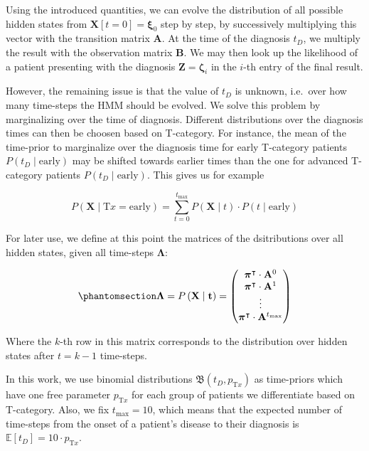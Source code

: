 \documentclass[
  sn-mathphys-num,
]{sn-jnl}
\begin{document}
Using the introduced quantities, we can evolve the distribution of all
possible hidden states from \(\mathbf{X}[t=0] = \boldsymbol{\xi}_0\)
step by step, by successively multiplying this vector with the
transition matrix \(\mathbf{A}\). At the time of the diagnosis \(t_D\),
we multiply the result with the observation matrix \(\mathbf{B}\). We
may then look up the likelihood of a patient presenting with the
diagnosis \(\mathbf{Z}=\boldsymbol{\zeta}_i\) in the \(i\)-th entry of
the final result.

However, the remaining issue is that the value of \(t_D\) is unknown,
i.e.~over how many time-steps the HMM should be evolved. We solve this
problem by marginalizing over the time of diagnosis. Different
distributions over the diagnosis times can then be choosen based on
T-category. For instance, the mean of the time-prior to marginalize over
the diagnosis time for early T-category patients
\(P\left( t_D \mid \text{early} \right)\) may be shifted towards earlier
times than the one for advanced T-category patients
\(P\left( t_D \mid \text{early} \right)\). This gives us for example

\[
P\left( \mathbf{X} \mid \text{T}x = \text{early} \right) = \sum_{t=0}^{t_\text{max}} P \left( \mathbf{X} \mid t \right) \cdot P(t \mid \text{early})
\]

For later use, we define at this point the matrices of the dsitributions
over all hidden states, given all time-steps \(\boldsymbol{\Lambda}\):

\begin{equation}\phantomsection\label{eq-lambda-matrix}{
\boldsymbol{\Lambda} = P \left( \mathbf{X} \mid \mathbf{t} \right) = \begin{pmatrix}
\boldsymbol{\pi}^\intercal \cdot \mathbf{A}^0 \\
\boldsymbol{\pi}^\intercal \cdot \mathbf{A}^1 \\
\vdots \\
\boldsymbol{\pi}^\intercal \cdot \mathbf{A}^{t_\text{max}} \\
\end{pmatrix}
}\end{equation}

Where the \(k\)-th row in this matrix corresponds to the distribution
over hidden states after \(t=k-1\) time-steps.

In this work, we use binomial distributions
\(\mathfrak{B} \left( t_D, p_{\text{T}x} \right)\) as time-priors which
have one free parameter \(p_{\text{T}x}\) for each group of patients we
differentiate based on T-category. Also, we fix \(t_\text{max} = 10\),
which means that the expected number of time-steps from the onset of a
patient's disease to their diagnosis is
\(\mathbb{E}\left[ t_D \right] = 10 \cdot p_{\text{T}x}\).
\end{document}
